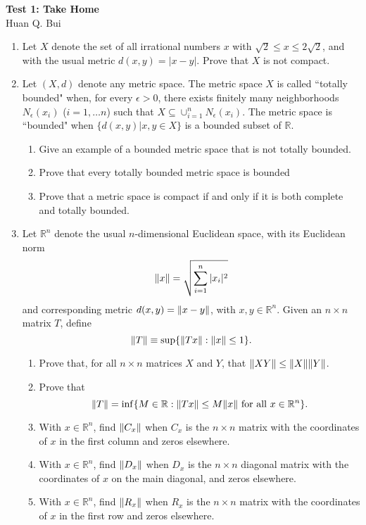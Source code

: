 \documentclass{article}
\begin{document}
\begin{center}
{\Large\bf  Test 1:  Take Home}\\
$\,$\\
{\Large  Huan Q. Bui}
\end{center}


\noindent 
\begin{enumerate}
\item  Let $X$ denote the set of all irrational numbers $x$ with $ \sqrt{2} \leq x \leq 2 \sqrt{2}$,   and with the usual metric $d(x,y) = | x - y |$.  Prove that $X$ is not compact.

\item  Let $(X,d)$ denote any metric space.  The metric space $X$ is called ``totally bounded" when,  for every $\epsilon > 0$,   there exists finitely many neighborhoods $N_\epsilon ( x_i )$  ($i=1,\ldots n$)
such that $X \subseteq \cup_{i=1}^n N_\epsilon ( x_i ) $.  The metric space is ``bounded" when $\{{d(x,y) \vert x,y \in X }\}$ is a bounded subset of $\mathbb{R}$.
\begin{enumerate}
\item  Give an example of a bounded metric space that is not totally bounded.
\item  Prove that every totally bounded metric space is bounded
\item  Prove that a metric space is compact if and only if it is both complete and totally bounded.
\end{enumerate}
\item  Let $\mathbb{R}^n$ denote the usual $n$-dimensional Euclidean space,   with its Euclidean  norm
$$ \norm{x}  = \sqrt{ \sum_{i=1}^n |x_i|^2}$$ and corresponding metric $d(x,y) = \norm{x  - y} $,  with    $ x,y \in \mathbb{R}^n$.
Given an $n \times n$ matrix $T$,  define 
$$ \norm{T}  \equiv \sup  \{ \norm{T x } : \norm{ x } \leq 1\} .$$

\begin{enumerate}
\item  Prove that,   for all $n \times n$ matrices $X$ and $Y$,  that $ \norm{X Y}  \leq  \norm{X}\norm{Y} $.
\item  Prove that
$$  \norm{T}  =  \inf  \{ M \in \mathbb{R} : \norm{Tx} \leq M \norm{x}  \mbox{ for all } x \in \mathbb{R}^n \}. $$
\item  With $x \in \mathbb{R}^n$,   find $ \norm{C_x}  $ when $C_x$ is the $n \times n$ matrix with the coordinates of $x$ in the first column and zeros elsewhere.
\item   With $x \in \mathbb{R}^n$,   find $ \norm{D_x} $ when $D_x$ is the $n \times n$ diagonal matrix with the coordinates of  $x$  on the main diagonal,
and zeros elsewhere.
\item  With $x \in \mathbb{R}^n$,   find $ \norm{R_x} $ when $R_x$ is the $n \times n$ matrix with the coordinates of $x$ in the first row and zeros elsewhere.


\end{enumerate}
\end{enumerate}
\end{document}
